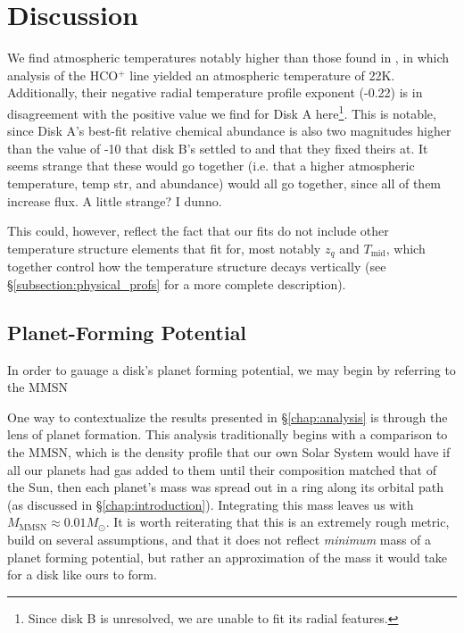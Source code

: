 \chapter{Discussion}
\label{chap:discussion}



We find atmospheric temperatures notably higher than those found in \citet{Factor2017}, in which analysis of the HCO$^+$ line yielded an atmospheric temperature of 22K. Additionally, their negative radial temperature profile exponent (-0.22) is in disagreement with the positive value we find for Disk A here\footnote{Since disk B is unresolved, we are unable to fit its radial features.}. This is notable, since Disk A's best-fit relative chemical abundance is also two magnitudes higher than the value of -10 that disk B's settled to and that they fixed theirs at. It seems strange that these would go together (i.e. that a higher atmospheric temperature, temp str, and abundance) would all go together, since all of them increase flux. A little strange? I dunno.

This could, however, reflect the fact that our fits do not include other temperature structure elements that \citet{Factor2017} fit for, most notably $z_q$ and $T_\text{mid}$, which together control how the temperature structure decays vertically (see \S\ref{subsection:physical_profs} for a more complete description).







\section{Planet-Forming Potential}
\label{section:fitting_procedure}

In order to gauage a disk's planet forming potential, we may begin by referring to the MMSN

One way to contextualize the results presented in \S\ref{chap:analysis} is through the lens of planet formation. This analysis traditionally begins with a comparison to the MMSN, which is the density profile that our own Solar System would have if all our planets had gas added to them until their composition matched that of the Sun, then each planet's mass was spread out in a ring along its orbital path (as discussed in \S\ref{chap:introduction}). Integrating this mass leaves us with $M_\text{MMSN} \approx 0.01 M_\odot$. It is worth reiterating that this is an extremely rough metric, build on several assumptions, and that it does not reflect \textit{minimum} mass of a planet forming potential, but rather an approximation of the mass it would take for a disk like ours to form.

